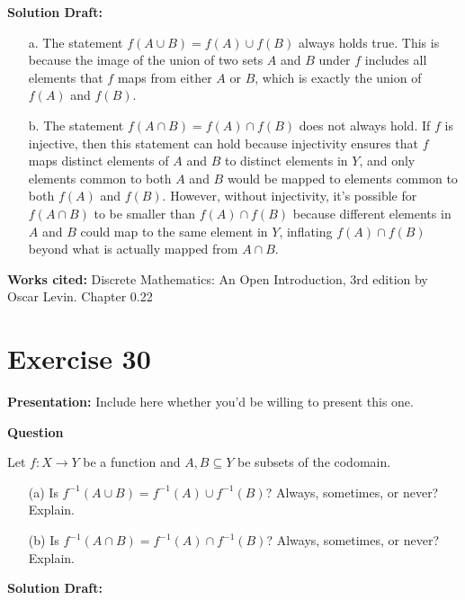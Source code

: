 \documentclass{article}
\begin{document}
\noindent\textbf{Solution Draft:} 

\begin{enumerate}
\item[a.]
The statement \( f(A \cup B) = f(A) \cup f(B) \) always holds true. This is because the image of the union of two sets \( A \) and \( B \) under \( f \) includes all elements that \( f \) maps from either \( A \) or \( B \), which is exactly the union of \( f(A) \) and \( f(B) \).

\item[b.]
The statement \( f(A \cap B) = f(A) \cap f(B) \) does not always hold. If \( f \) is injective, then this statement can hold because injectivity ensures that \( f \) maps distinct elements of \( A \) and \( B \) to distinct elements in \( Y \), and only elements common to both \( A \) and \( B \) would be mapped to elements common to both \( f(A) \) and \( f(B) \). However, without injectivity, it's possible for \( f(A \cap B) \) to be smaller than \( f(A) \cap f(B) \) because different elements in \( A \) and \( B \) could map to the same element in \( Y \), inflating \( f(A) \cap f(B) \) beyond what is actually mapped from \( A \cap B \).
\end{enumerate}
\vspace{0.5cm}
\textbf{Works cited:}
Discrete Mathematics: An Open Introduction, 3rd edition by Oscar Levin. Chapter 0.22
\section*{Exercise 30}  

\noindent\textbf{Presentation:} Include here whether you'd be willing to present this one. 

\vspace{0.5cm} %

\noindent\textbf{Question}

Let \( f : X \to Y \) be a function and \( A, B \subseteq Y \) be subsets of the codomain.
\begin{enumerate}
    \item[(a)] Is \( f^{-1}(A \cup B) = f^{-1}(A) \cup f^{-1}(B) \)? Always, sometimes, or never? Explain.
    \item[(b)] Is \( f^{-1}(A \cap B) = f^{-1}(A) \cap f^{-1}(B) \)? Always, sometimes, or never? Explain.
\end{enumerate}

\noindent\textbf{Solution Draft:} 
\end{document}
